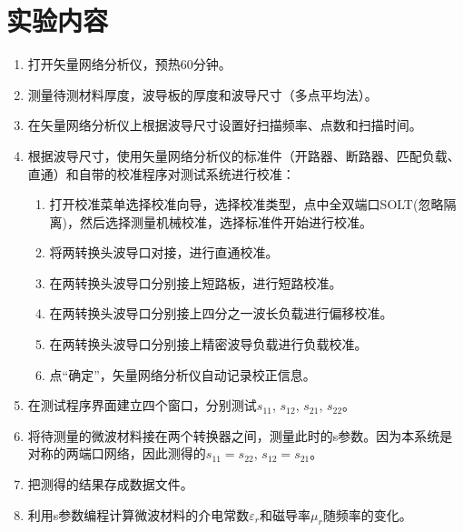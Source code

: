 \documentclass[a4paper]{article}
\begin{document}
\section{实验内容}
\begin{enumerate}
\item 打开矢量网络分析仪，预热60分钟。
\item 测量待测材料厚度，波导板的厚度和波导尺寸（多点平均法）。
\item 在矢量网络分析仪上根据波导尺寸设置好扫描频率、点数和扫描时间。
\item 根据波导尺寸，使用矢量网络分析仪的标准件（开路器、断路器、匹配负载、直通）和自带的校准程序对测试系统进行校准：
\begin{enumerate}
\item 打开校准菜单选择校准向导，选择校准类型，点中全双端口SOLT(忽略隔离)，然后选择测量机械校准，选择标准件开始进行校准。
\item 将两转换头波导口对接，进行直通校准。
\item 在两转换头波导口分别接上短路板，进行短路校准。
\item 在两转换头波导口分别接上四分之一波长负载进行偏移校准。
\item 在两转换头波导口分别接上精密波导负载进行负载校准。
\item 点“确定”，矢量网络分析仪自动记录校正信息。
\end{enumerate}
\item 在测试程序界面建立四个窗口，分别测试$s_{11}$, $s_{12}$, $s_{21}$, $s_{22}$。
\item 将待测量的微波材料接在两个转换器之间，测量此时的s参数。因为本系统是对称的两端口网络，因此测得的$s_{11}=s_{22}$, $s_{12}=s_{21}$。
\item 把测得的结果存成数据文件。
\item 利用s参数编程计算微波材料的介电常数$\varepsilon_r$和磁导率$\mu_r$随频率的变化。
\end{enumerate}
\end{document}
